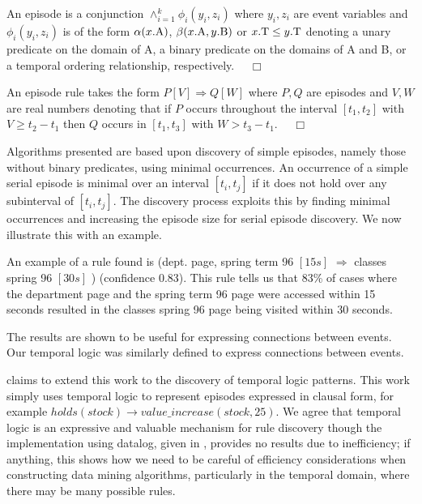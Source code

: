 \begin{definition}
\begin{rm}
An episode is a conjunction $\wedge_{i=1}^k \phi_i (y_i,z_i)$ where
$y_i,z_i$ are event variables and $\phi_i (y_i,z_i)$ is of the form
$\alpha(x.{\rm A})$, $\beta(x.{\rm A},y.{\rm B})$ or $x.{\rm T} \le
y.{\rm T}$
denoting a unary 
predicate on the domain of A, a binary predicate on the domains of A
and B, or a temporal ordering relationship, respectively. $\quad\Box$
\end{rm}
\end{definition}


\begin{definition}
\begin{rm}
An episode rule takes the form $P[V] \Rightarrow Q[W]$ where $P,Q$ are
episodes and $V,W$ are real numbers denoting that if $P$ occurs
throughout the interval $[t_1,t_2]$ with $V \ge t_2 - t_1$ then $Q$
occurs in $[t_1,t_3]$ with $W > t_3 - t_1$. $\quad\Box$
\end{rm}
\end{definition}

Algorithms presented are based upon discovery of simple episodes,
namely those without binary predicates, using minimal occurrences. An
occurrence of a simple serial episode is minimal over an interval $[t_i,t_j]$
if it does not hold 
over any subinterval of $[t_i,t_j]$. The discovery process exploits this by
finding minimal occurrences and increasing the episode size for serial
episode discovery. We now illustrate this with an example.

\begin{example}
\begin{rm}
An example of a rule found is (dept. page, spring term 96 $[15s]$
$\Rightarrow$ classes spring 96 $[30s]$ ) (confidence 0.83).  This
rule tells us that 83\% of cases where the department page and the
spring term 96 page were accessed within 15 seconds resulted in the
classes spring 96 page being visited within 30 seconds.
\end{rm}
\end{example}

The results are shown to be useful for expressing connections between
events. Our temporal logic was similarly defined to express
connections between events.

\medskip

\cite{pt96} claims to extend this work to the discovery of temporal
logic patterns. This work simply uses temporal logic to represent
episodes expressed in clausal form, for example $holds(stock) \to
value\_increase(stock,25)$. We agree that temporal logic is an
expressive and valuable mechanism for rule discovery though the
implementation using datalog, given in \cite{pt96}, provides no
results due to inefficiency; if anything, this shows how we need to be
careful of 
efficiency considerations when constructing data mining algorithms,
particularly in the temporal domain, where there may be many possible
rules. 

